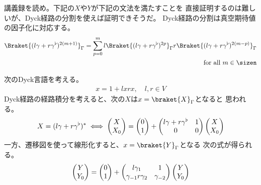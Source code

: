 {	\begin{todo}[Dyck言語]\label{todo:Dyck言語} %
		講義録\cite{bm2000}を読め。下記の$X$や$Y$が下記の文法を満たすことを
		直接証明するのは難しいが、Dyck経路の分割を使えば証明できそうだ。
		Dyck経路の分割は真空期待値の因子化に対応する。
		\begin{equation*}\begin{split}
			\Braket{(l\gamma + r\gamma^\flat)^{2(m+1)}}_\Gamma
			= \sum_{p=0}^m l\Braket{(l\gamma + r\gamma^\flat)^{2p}}_\Gamma
				r\Braket{(l\gamma + r\gamma^\flat)^{2(m-p)}}_\Gamma \\
			\quad\text{for all } m\in\sizen
		\end{split}\end{equation*}

		次のDyck言語を考える\cite{bm2000}。
		\begin{equation*}\begin{split}
			x = 1 + lxrx,\quad l,r\in V
		\end{split}\end{equation*}
		Dyck経路の経路積分を考えると、次の$X$は$x=\braket{X}_\Gamma$となると
		思われる。
		\begin{equation*}\begin{split}
			X = (l\gamma + r\gamma^\flat)^* \iff
			\begin{pmatrix}{X}\\{X_0}\end{pmatrix} = \begin{pmatrix}{0}\\{1}\end{pmatrix} + \begin{pmatrix}
				l\gamma + r\gamma^\flat & 1 \\ 0 & 0
			\end{pmatrix}\begin{pmatrix}{X}\\{X_0}\end{pmatrix}
		\end{split}\end{equation*}
		一方、遷移図を使って線形化すると、$x=\braket{Y}_\Gamma$となる
		次の式が得られる。
		\begin{equation*}\begin{split}
			\begin{pmatrix}{Y}\\{Y_0}\end{pmatrix} = \begin{pmatrix}{0}\\{1}\end{pmatrix} + \begin{pmatrix}
				l\gamma_1 & 1 \\ \gamma_{-1}r\gamma_2 & \gamma_{-2}
			\end{pmatrix}\begin{pmatrix}{Y}\\{Y_0}\end{pmatrix}
		\end{split}\end{equation*}
	\end{todo} %

}
